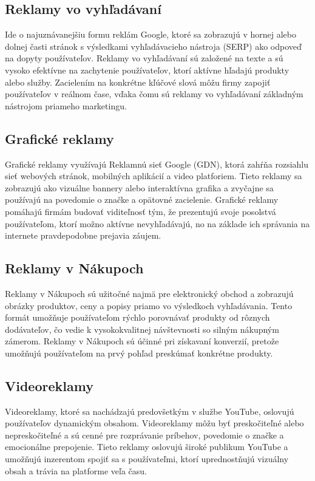 \documentclass[10pt,slovak,a4paper]{article}
\begin{document}
\subsection{Reklamy vo vyhľadávaní}
Ide o najuznávanejšiu formu reklám Google, ktoré sa zobrazujú v hornej alebo dolnej časti stránok s výsledkami 
vyhľadávacieho nástroja (SERP) ako odpoveď na dopyty používateľov. Reklamy vo vyhľadávaní sú založené na texte a 
sú vysoko efektívne na zachytenie používateľov, ktorí aktívne hľadajú produkty alebo služby. Zacielením na konkrétne 
kľúčové slová môžu firmy zapojiť používateľov v reálnom čase, vďaka čomu sú reklamy vo vyhľadávaní základným nástrojom 
priameho marketingu. 
\subsection{Grafické reklamy}
Grafické reklamy využívajú Reklamnú sieť Google (GDN), ktorá zahŕňa rozsiahlu sieť webových stránok, mobilných aplikácií 
a video platforiem. Tieto reklamy sa zobrazujú ako vizuálne bannery alebo interaktívna grafika a zvyčajne sa používajú 
na povedomie o značke a opätovné zacielenie. Grafické reklamy pomáhajú firmám budovať viditeľnosť tým, že prezentujú 
svoje posolstvá používateľom, ktorí možno aktívne nevyhľadávajú, no na základe ich správania na internete pravdepodobne 
prejavia záujem.

\subsection{Reklamy v Nákupoch}
Reklamy v Nákupoch sú užitočné najmä pre elektronický obchod a zobrazujú obrázky produktov, ceny a popisy priamo vo 
výsledkoch vyhľadávania. Tento formát umožňuje používateľom rýchlo porovnávať produkty od rôznych dodávateľov, čo vedie k 
vysokokvalitnej návštevnosti so silným nákupným zámerom. Reklamy v Nákupoch sú účinné pri získavaní konverzií, 
pretože umožňujú používateľom na prvý pohľad preskúmať konkrétne produkty.

\subsection{Videoreklamy}
Videoreklamy, ktoré sa nachádzajú predovšetkým v službe YouTube, oslovujú používateľov dynamickým obsahom. 
Videoreklamy môžu byť preskočiteľné alebo nepreskočiteľné a sú cenné pre rozprávanie príbehov, povedomie o značke a 
emocionálne prepojenie. Tieto reklamy oslovujú široké publikum YouTube a umožňujú inzerentom spojiť sa s používateľmi, 
ktorí uprednostňujú vizuálny obsah a trávia na platforme veľa času.
\end{document}
